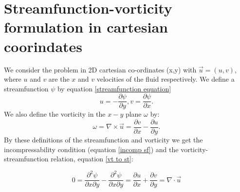 \documentclass{article}
\begin{document}
\section*{Streamfunction-vorticity formulation in cartesian coorindates}
We consider the problem in 2D cartesian co-ordinates (x,y) with $\vec{u}=(u,v)$, where $u$ and $v$ are the $x$ and $v$ velocities of the fluid respectively. We define a streamfunction $\psi$ by equation \ref{streamfunction equation}
\begin{equation}
	u = - \frac{\partial \psi}{\partial y}, v = \frac{\partial \psi}{\partial x}.
\end{equation}
We also define the vorticity in the $x-y$ plane $\omega$ by:
\begin{equation}
	\omega = \nabla \times \vec{u} = \frac{\partial v}{\partial x} - \frac{\partial u}{\partial y}.
	\label{vorticity}
\end{equation}
By these definitions of the streamfunction and vorticity we get the incompressability condition (equation \ref{incomp sf}) and the vorticity-streamfunction relation, equation \ref{vt to st}:

\begin{equation}
	0=\frac{\partial^2 \psi}{\partial x \partial y} - \frac{\partial^2 \psi}{\partial x \partial y} = \frac{\partial u}{\partial x} + \frac{\partial v}{\partial y} = \nabla \cdot \vec{u}
	\label{incomp sf}
\end{equation}
\end{document}
